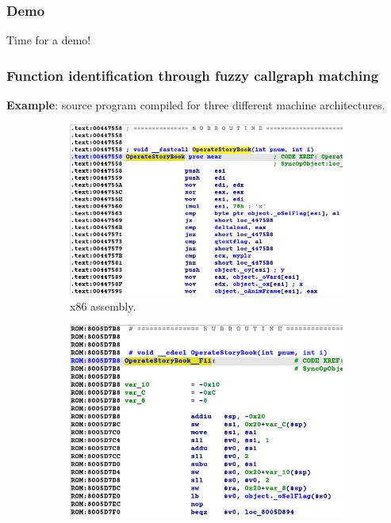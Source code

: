 \begin{frame}
	\frametitle{Demo}

Time for a demo!

\end{frame}

\begin{frame}
	\frametitle{Function identification through fuzzy callgraph matching}

\textbf{Example}: source program compiled for three different machine architectures.

	\begin{figure}[htbp]
		\centering
		\begin{subfigure}[t]{0.32\textwidth}
			\centering
			\includegraphics[width=\linewidth,valign=t]{inc/example/x86_zoom.png}
			\caption{x86 assembly.}
		\end{subfigure}
		\hfill
		\begin{subfigure}[t]{0.32\textwidth}
			\centering
			\includegraphics[width=\linewidth,valign=t]{inc/example/mips_zoom.png}

\end{subfigure}
\end{figure}
\end{frame}
